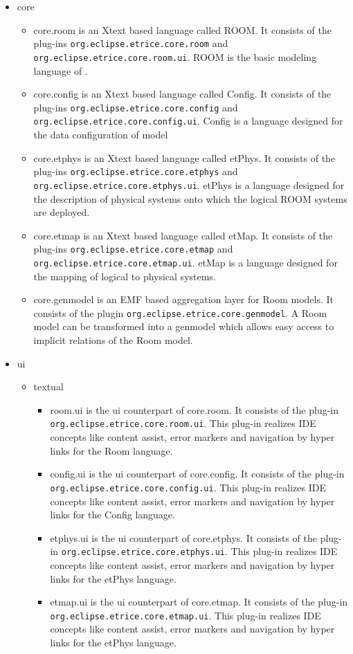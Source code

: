 \begin{itemize}
\item core

\begin{itemize}
\item core.room is an Xtext based language called ROOM. It consists of the plug-ins
\texttt{org.eclipse.etrice.core.room} and
\texttt{org.eclipse.etrice.core.room.ui}. ROOM is the basic modeling language of \eTrice{}.
\item core.config is an Xtext based language called Config. It consists of the plug-ins
\texttt{org.eclipse.etrice.core.config} and
\texttt{org.eclipse.etrice.core.config.ui}. Config is a language designed for the data configuration of model 
\item core.etphys is an Xtext based language called etPhys. It consists of the plug-ins
\texttt{org.eclipse.etrice.core.etphys} and
\texttt{org.eclipse.etrice.core.etphys.ui}. etPhys is a language designed for the description of physical systems
onto which the logical ROOM systems are deployed.
\item core.etmap is an Xtext based language called etMap. It consists of the plug-ins
\texttt{org.eclipse.etrice.core.etmap} and
\texttt{org.eclipse.etrice.core.etmap.ui}. etMap is a language designed for the mapping of logical
to physical systems.
\item core.genmodel is an EMF based aggregation layer for Room models. It consists of the plugin 
\texttt{org.eclipse.etrice.core.genmodel}. A Room model can be transformed into a genmodel which allows 
easy access to implicit relations of the Room model.
\end{itemize}

\item ui
\begin{itemize}
\item textual
\begin{itemize}

\item room.ui is the ui counterpart of core.room.  It consists of the plug-in 
\texttt{org.eclipse.etrice.core.room.ui}. This plug-in realizes IDE concepts like content assist, error 
markers and navigation by hyper links for the Room language.
\item config.ui is the ui counterpart of core.config.  It consists of the plug-in 
\texttt{org.eclipse.etrice.core.config.ui}. This plug-in realizes IDE concepts like content assist, error 
markers and navigation by hyper links for the Config language.
\item etphys.ui is the ui counterpart of core.etphys.  It consists of the plug-in 
\texttt{org.eclipse.etrice.core.etphys.ui}. This plug-in realizes IDE concepts like content assist, error 
markers and navigation by hyper links for the etPhys language.
\item etmap.ui is the ui counterpart of core.etmap.  It consists of the plug-in 
\texttt{org.eclipse.etrice.core.etmap.ui}. This plug-in realizes IDE concepts like content assist, error 
markers and navigation by hyper links for the etPhys language.
\end{itemize}


\end{itemize}
\end{itemize}
